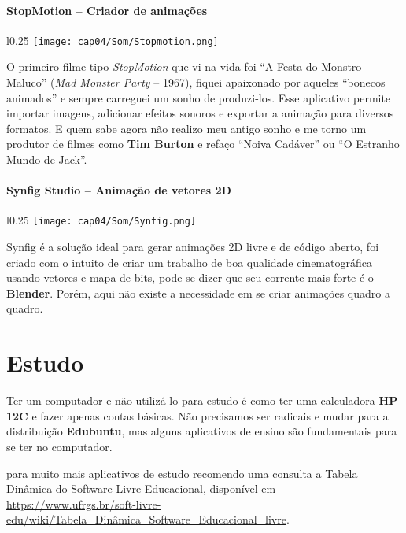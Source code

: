 \paragraph{StopMotion – Criador de animações}
\begin{minipage}{\linewidth}
 \vspace{5pt}
 \begin{wrapfigure}{l}{0.25\textwidth}
  \vspace{-\baselineskip}
  \texttt{[image: cap04/Som/Stopmotion.png]} 
 \end{wrapfigure}
 O primeiro filme tipo \textit{StopMotion} que vi na vida foi ``A Festa do Monstro Maluco'' (\textit{Mad Monster Party} – 1967), fiquei apaixonado por aqueles ``bonecos animados'' e sempre carreguei um sonho de produzi-los. Esse aplicativo permite importar imagens, adicionar efeitos sonoros e exportar a animação para diversos formatos. E quem sabe agora não realizo meu antigo sonho e me torno um produtor de filmes como \textbf{Tim Burton} e refaço ``Noiva Cadáver'' ou ``O Estranho Mundo de Jack''.
\end{minipage}

\paragraph{Synfig Studio – Animação de vetores 2D}
\begin{minipage}{\linewidth}
 \vspace{5pt}
 \begin{wrapfigure}{l}{0.25\textwidth}
  \vspace{-\baselineskip}
  \texttt{[image: cap04/Som/Synfig.png]} 
 \end{wrapfigure}
 Synfig é a solução ideal para gerar animações 2D livre e de código aberto, foi criado com o intuito de criar um trabalho de boa qualidade cinematográfica usando vetores e mapa de bits, pode-se dizer que seu corrente mais forte é o \textbf{Blender}. Porém, aqui não existe a necessidade em se criar animações quadro a quadro.
\end{minipage}

\section{Estudo}
Ter um computador e não utilizá-lo para estudo é como ter uma calculadora \textbf{HP 12C} e fazer apenas contas básicas. Não precisamos ser radicais e mudar para a distribuição \textbf{Edubuntu}, mas alguns aplicativos de ensino são fundamentais para se ter no computador. \\[3mm]
\begin{dica} para muito mais aplicativos de estudo recomendo uma consulta a Tabela Dinâmica do Software Livre Educacional, disponível em \url{https://www.ufrgs.br/soft-livre-edu/wiki/Tabela_Dinâmica_Software_Educacional_livre}.
\end{dica}

